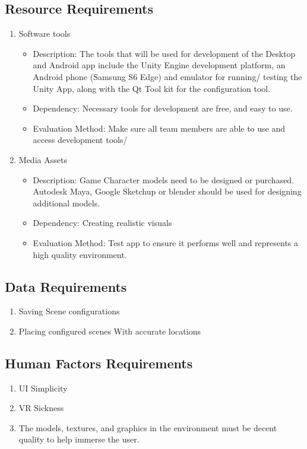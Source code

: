 \documentclass[a4paper,10pt,twoside]{article}
\begin{document}
	\subsection{Resource Requirements}
	\begin{enumerate}
	\item Software tools
	\begin{itemize}
	\item Description: The tools that will be used for development of the Desktop and Android app  include the Unity Engine development platform, an Android phone (Samsung S6 Edge) and emulator for running/ testing the Unity App,
	  along with the Qt Tool kit for the configuration tool.
	\item  Dependency: Necessary tools for development are free, and easy to use. 
	\item Evaluation Method: Make sure all team members are able to use and access development tools/
	  \end{itemize}
	\item Media Assets
	\begin{itemize}
	  \item Description: Game Character models need to be designed or purchased. Autodesk Maya, Google Sketchup or blender should be used for designing additional models. 
	  \item Dependency: Creating realistic visuals 
	  \item Evaluation Method: Test app to ensure it performs well and represents a high quality environment.
	\end{itemize}
	\end{enumerate}

	\subsection{Data Requirements}
	\begin{enumerate}
	\item Saving Scene configurations
	\item Placing configured scenes With accurate locations
	\end{enumerate}

	\subsection{Human Factors Requirements}
	\begin{enumerate}
	\item UI Simplicity
	\item VR Sickness	 
	\item The models, textures, and graphics in the environment must be decent quality to help immerse the user.
	\end{enumerate}
\end{document}
